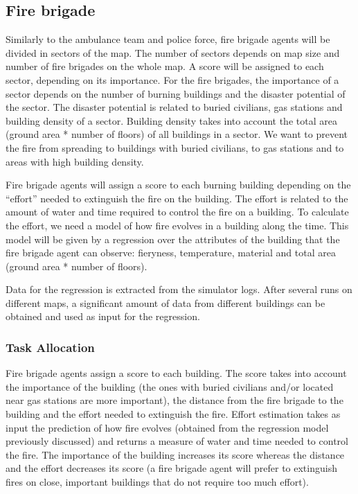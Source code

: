 \subsection{Fire brigade}
\label{sec:firefighters}
Similarly to the ambulance team and police force, fire brigade agents will be divided in sectors of the map. The number of sectors depends on map size and number of fire brigades on the whole map. A score will be assigned to each sector, depending on its importance. For the fire brigades, the importance of a sector depends on the number of burning buildings and the disaster potential of the sector. The disaster potential is related to buried civilians, gas stations and building density of a sector. Building density takes into account the total area (ground area * number of floors) of all buildings in a sector. We want to prevent the fire from spreading to buildings with buried civilians, to gas stations and to areas with high building density.

Fire brigade agents will assign a score to each burning building depending on the ``effort'' needed to extinguish the fire on the building. The effort is related to the amount of water and time required to control the fire on a building. To calculate the effort, we need a model of how fire evolves in a building along the time. This model will be given by a regression over the attributes of the building that the fire brigade agent can observe: fieryness, temperature, material and total area (ground area * number of floors).

Data for the regression is extracted from the simulator logs. After several runs on different maps, a significant amount of data from different buildings can be obtained and used as input for the regression.

\subsubsection{Task Allocation}

Fire brigade agents assign a score to each building. The score takes into account the importance of the building (the ones with buried civilians and/or located near gas stations are more important), the distance from the fire brigade to the building and the effort needed to extinguish the fire. Effort estimation takes as input the prediction of how fire evolves (obtained from the regression model previously discussed) and returns a measure of water and time needed to control the fire. The importance of the building increases its score whereas the distance and the effort decreases its score (a fire brigade agent will prefer to extinguish fires on close, important buildings that do not require too much effort).

